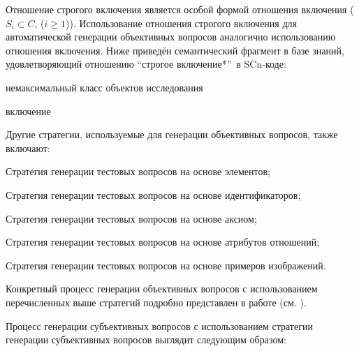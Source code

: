 \begin{textitemize}
\begin{textitemize}
		Отношение строгого включения является особой формой отношения включения ($S_{i}\subset  C $, ($i\ge 1$)). Использование отношения строгого включения для автоматической генерации объективных вопросов аналогично использованию отношения включения. Ниже приведён семантический фрагмент в базе знаний, удовлетворяющий отношению ``строгое включение*''\ в SCn-коде:
		
		\begin{SCn}
		
		\begin{scnhaselementrolelist}{немаксимальный класс объектов исследования}
			\begin{scnrelfromlist}{включение} 
			\end{scnrelfromlist}
		\end{scnhaselementrolelist}
		\end{SCn}
	\end{textitemize}
	
\end{textitemize}	

Другие стратегии, используемые для генерации объективных вопросов, также включают:
\begin{textitemize}
	\item Стратегия генерации тестовых вопросов на основе элементов;
	\item Стратегия генерации тестовых вопросов на основе идентификаторов;
	\item Стратегия генерации тестовых вопросов на основе аксиом; 
	\item Стратегия генерации тестовых вопросов на основе атрибутов отношений;
	\item Стратегия генерации тестовых вопросов на основе примеров изображений.
\end{textitemize}

Конкретный процесс генерации объективных вопросов с использованием перечисленных выше стратегий подробно представлен в работе (см. ).

Процесс генерации субъективных вопросов с использованием стратегии генерации субъективных вопросов выглядит следующим образом:

